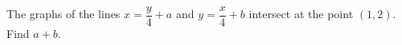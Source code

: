 The graphs of the lines $x=\dfrac{y}{4}+a$ and $y=\dfrac{x}{4}+b$ intersect at the point $(1,2)$. Find $a+b$.
